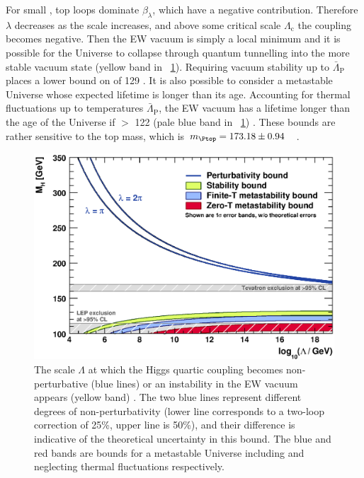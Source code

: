 For small \mH, top loops dominate $\beta_{\lambda}$, which have a negative 
contribution. Therefore $\lambda$ decreases as the scale increases, and above some 
critical scale $\Lambda_{\text{c}}$ the coupling becomes negative. Then the \ac{EW} 
vacuum is simply a local minimum and it is possible for the Universe to collapse through
quantum tunnelling into the more stable vacuum state (yellow band in 
\Figure~\ref{fig:theory_constraints}). Requiring vacuum stability up to 
$\bar{\Lambda}_{\text{P}}$ places a lower bound on \mH of \unit{129}{\GeV} 
\cite{Ellis:2009}. 
It is also possible to consider a metastable Universe whose expected lifetime is longer 
than its age. Accounting for thermal fluctuations up to temperatures 
\about$\bar{\Lambda}_{\text{P}}$, the \ac{EW} vacuum has a lifetime longer than the age 
of the Universe if \mH $>$ \unit{122}{\GeV} (pale blue band in 
\Figure~\ref{fig:theory_constraints}) \cite{Ellis:2009}. These bounds are rather 
sensitive to the top mass, which is 
\unit{$m_{\Ptop} = 173.18 \pm 0.94$}{\GeV} \cite{TopMass}.

\begin{figure}
	\includegraphics[width=\mediumfigwidth]{tex/motivation/theory_constraints}
	\caption{The scale $\Lambda$ at which the Higgs quartic coupling becomes 
	non-perturbative (blue lines) or an instability in the \ac{EW} vacuum appears
	(yellow band) \cite{Ellis:2009}. The two blue lines represent different degrees of 
	non-perturbativity (lower line corresponds to a two-loop correction of 25\%, upper 
	line is 50\%), and their difference is indicative of the theoretical uncertainty in 
	this bound. The blue and red bands are bounds for a metastable Universe including and
	neglecting thermal fluctuations respectively.}
	\label{fig:theory_constraints}
\end{figure}
